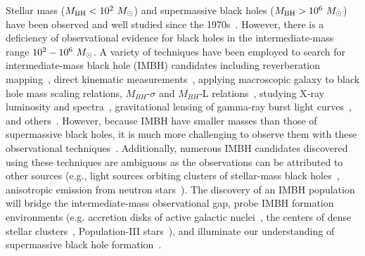 \documentclass[useAMS,fleqn, usenatbib, final]{mnras}
\begin{document}
Stellar mass (${M_\text{BH} < 10^{2}~\msun}$) and supermassive black holes (${M_\text{BH} > 10^{6}~\msun}$) have been observed and well studied since the 1970s~\citep{Webster:1972:Natur, Balick:1974:ApJ, Ghez:1998:ApJ, Genzel:2010:RvMP, Abbott:2019:PhRvX, EventHorizonTelescopeCollaboration:2019:ApJL, Abbott:2020:arXiv}. 
However, there is a deficiency of observational evidence for black holes in the intermediate-mass range ${10^{2} - 10^{6}~\msun}$. 
A variety of techniques have been employed to search for intermediate-mass black hole (IMBH) candidates including reverberation mapping~\citep{Peterson:2014:SSRv}, direct kinematic measurements~\citep{Schodel:2002:Natur, Kiziltan:2017:Natur}, applying macroscopic galaxy to black hole mass scaling relations, $M_{BH}$-$\sigma$ and $M_{BH}$-L relations~\citep{Graham:2013:ApJ, Wevers:2017:MNRAS}, studying  X-ray luminosity and spectra~\citep{Greene:2004:ApJ, Lin:2020:ApJL}, gravitational lensing of gamma-ray burst light curves~\citep{paynter_evidence_2021}, and others~\citep[see][]{Greene:2020:ARA&A, Koliopanos:2017:mbhe, Mezcua:2017:IJMPD}.
However, because IMBH have smaller masses than those of supermassive black holes, it is much more challenging to observe them with these observational techniques~\citep{Mezcua:2017:IJMPD}. 
Additionally, numerous IMBH candidates discovered using these techniques are ambiguous as the observations can be attributed to other sources (e.g., light sources orbiting clusters of stellar-mass black holes~\citealt{Ridolfi:2016:MNRAS, Freire:2017:MNRAS},  anisotropic emission from neutron stars~\citealt{Israel:2017:MNRAS, RodriguezCastillo:2020:ApJ}).
The discovery of an IMBH population will bridge the intermediate-mass observational gap, probe IMBH formation environments (e.g. accretion disks of active galactic nuclei~\citealt{Tagawa:2021:ApJ, Li:2021:arXiv, Samsing:2020:arXiv, Tagawa:2020:ApJ, Ishibashi:2020:A&A, Grobner:2020:A&A, Yang:2019:PhRvL, McKernan:2019:ApJL, Yang:2019:ApJ, McKernan:2018:ApJ, Bellovary:2016:ApJL, McKernan:2014:MNRAS, McKernan:2012:MNRAS}, the centers of dense stellar clusters~\citealt{Banerjee:2021:MNRASa, Zevin:2021:ApJ,Mapelli:2021:arXiv,Weatherford:2021:ApJL, Bouffanais:2021:arXiv, Ballone:2021:MNRAS, Kumamoto:2021:arXiv, Banerjee:2021:MNRASb, Martinez:2020:ApJ, Romero-Shaw:2020:ApJL, Anagnostou:2020:PASA}, Population-III stars~\citealt{Toubiana:2021:PhRvL, Farrell:2021:MNRAS, Safarzadeh:2020:ApJL, Liu:2020:MNRAS, Inayoshi:2017:MNRAS}), and illuminate our understanding of supermassive black hole formation~\citep{Askar:2021:MNRAS, ArcaSedda:2019:arXiv, Amaro-Seoane:2007:CQGra, Gurkan:2006:ApJL}. 
\end{document}
